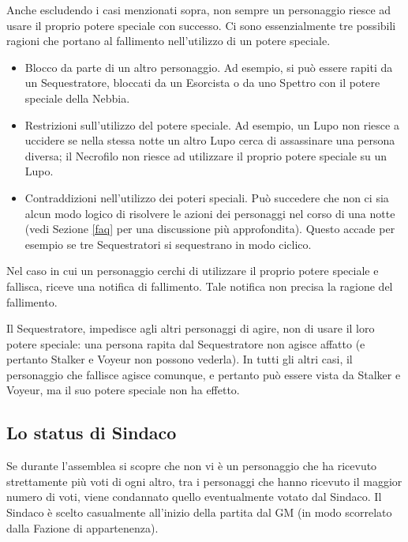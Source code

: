 \documentclass[a4paper,10pt]{article}
\begin{document}
Anche escludendo i casi menzionati sopra, non sempre un personaggio riesce ad usare il proprio potere speciale con successo.
Ci sono essenzialmente tre possibili ragioni che portano al fallimento nell'utilizzo di un potere speciale.
\begin{itemize}
 \item Blocco da parte di un altro personaggio. Ad esempio, si può essere rapiti da un Sequestratore, bloccati da un Esorcista o da uno Spettro con il potere speciale della Nebbia.
 \item Restrizioni sull'utilizzo del potere speciale. Ad esempio, un Lupo non riesce a uccidere se nella stessa notte un altro Lupo cerca di assassinare una persona diversa; il Necrofilo non riesce ad utilizzare il proprio potere speciale su un Lupo.
 \item Contraddizioni nell'utilizzo dei poteri speciali. Può succedere che non ci sia alcun modo logico di risolvere le azioni dei personaggi nel corso di una notte (vedi Sezione \ref{faq} per una discussione più approfondita). Questo accade per esempio se tre Sequestratori si sequestrano in modo ciclico.
\end{itemize}

Nel caso in cui un personaggio cerchi di utilizzare il proprio potere speciale e fallisca, riceve una notifica di fallimento. Tale notifica non precisa la ragione del fallimento.

Il Sequestratore, impedisce agli altri personaggi di agire, non di usare il loro potere speciale: una persona rapita dal Sequestratore non agisce affatto (e pertanto Stalker e Voyeur non possono vederla).
In tutti gli altri casi, il personaggio che fallisce agisce comunque, e pertanto può essere vista da Stalker e Voyeur, ma il suo potere speciale non ha effetto. 


\subsection{Lo status di Sindaco}
\label{sindaco}

Se durante l'assemblea si scopre che non vi è un personaggio che ha ricevuto strettamente più voti di ogni altro, tra i personaggi che hanno ricevuto il maggior numero di voti, viene condannato quello eventualmente votato dal Sindaco.
Il Sindaco è scelto casualmente all'inizio della partita dal GM (in modo scorrelato dalla Fazione di appartenenza).
\end{document}
